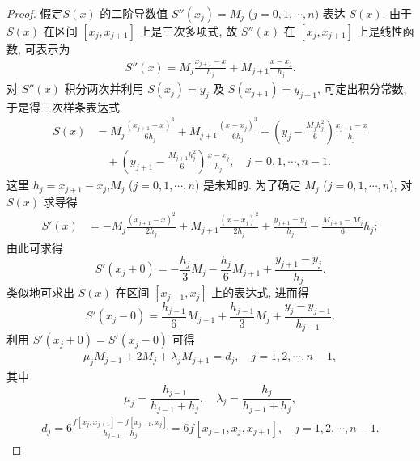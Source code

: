 \documentclass[../../main.tex]{subfiles}%
\begin{document}
\begin{proof}

假定$S(x)$ 的二阶导数值 $S''(x_j) = M_j$ ($j = 0, 1, \cdots, n$) 表达 $S(x)$. 由于 $S(x)$ 在区间 $[x_j, x_{j + 1}]$ 上是三次多项式, 故 $S''(x)$ 在 $[x_j, x_{j + 1}]$ 上是线性函数, 可表示为
\begin{align}
S''(x) = M_j \frac{x_{j + 1} - x}{h_j} + M_{j + 1} \frac{x - x_j}{h_j}. \label{eq:数值分析-6.7}
\end{align}
对 $S''(x)$ 积分两次并利用 $S(x_j) = y_j$ 及 $S(x_{j + 1}) = y_{j + 1}$, 可定出积分常数, 于是得三次样条表达式
\begin{align}
S(x) &= M_j \frac{(x_{j + 1} - x)^3}{6 h_j} + M_{j + 1} \frac{(x - x_j)^3}{6 h_j} + \left( y_j - \frac{M_j h_j^2}{6} \right) \frac{x_{j + 1} - x}{h_j} \nonumber \\
&\quad + \left( y_{j + 1} - \frac{M_{j + 1} h_j^2}{6} \right) \frac{x - x_j}{h_j}, \quad j = 0, 1, \cdots, n - 1. \label{eq:数值分析-6.8}
\end{align}
这里 $h_j=x_{j+1}-x_j$,$M_j$ ($j = 0, 1, \cdots, n$) 是未知的. 为了确定 $M_j$ ($j = 0, 1, \cdots, n$), 对 $S(x)$ 求导得
\begin{align}
S'(x) &= -M_j \frac{(x_{j + 1} - x)^2}{2 h_j} + M_{j + 1} \frac{(x - x_j)^2}{2 h_j} + \frac{y_{j + 1} - y_j}{h_j} - \frac{M_{j + 1} - M_j}{6} h_j; \label{eq:数值分析-6.9}
\end{align}
由此可求得
\[
S'(x_j + 0) = -\frac{h_j}{3} M_j - \frac{h_j}{6} M_{j + 1} + \frac{y_{j + 1} - y_j}{h_j}.
\]
类似地可求出 $S(x)$ 在区间 $[x_{j - 1}, x_j]$ 上的表达式, 进而得
\[
S'(x_j - 0) = \frac{h_{j - 1}}{6} M_{j - 1} + \frac{h_{j - 1}}{3} M_j + \frac{y_j - y_{j - 1}}{h_{j - 1}}.
\]
利用 $S'(x_j + 0) = S'(x_j - 0)$ 可得
\begin{align}
\mu_j M_{j - 1} + 2 M_j + \lambda_j M_{j + 1} = d_j, \quad j = 1, 2, \cdots, n - 1, \label{eq:数值分析-6.10}
\end{align}
其中
\[
\mu_j = \frac{h_{j - 1}}{h_{j - 1} + h_j}, \quad \lambda_j = \frac{h_j}{h_{j - 1} + h_j},
\]
\begin{align}
d_j = 6 \frac{f[x_j, x_{j + 1}] - f[x_{j - 1}, x_j]}{h_{j - 1} + h_j} = 6 f[x_{j - 1}, x_j, x_{j + 1}], \quad j = 1, 2, \cdots, n - 1. \label{eq:数值分析-6.11}
\end{align}


\end{proof}
\end{document}
